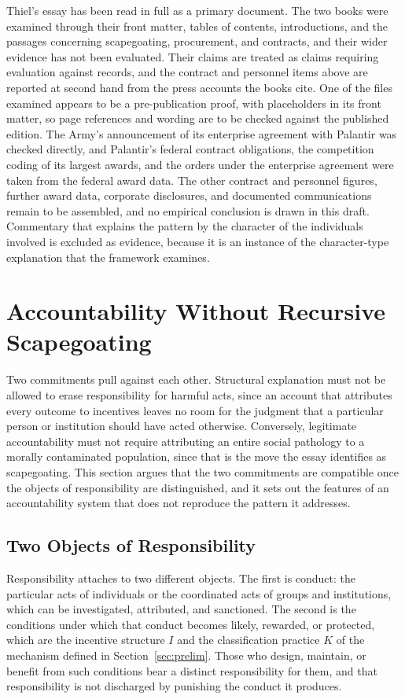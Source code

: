 \documentclass[12pt]{article}
\theoremstyle{remark}
\begin{document}
Thiel's essay has been read in full as a primary document. The two books were examined through their front matter, tables of contents, introductions, and the passages concerning scapegoating, procurement, and contracts, and their wider evidence has not been evaluated. Their claims are treated as claims requiring evaluation against records, and the contract and personnel items above are reported at second hand from the press accounts the books cite. One of the files examined appears to be a pre-publication proof, with placeholders in its front matter, so page references and wording are to be checked against the published edition. The Army's announcement of its enterprise agreement with Palantir was checked directly, and Palantir's federal contract obligations, the competition coding of its largest awards, and the orders under the enterprise agreement were taken from the federal award data. The other contract and personnel figures, further award data, corporate disclosures, and documented communications remain to be assembled, and no empirical conclusion is drawn in this draft. Commentary that explains the pattern by the character of the individuals involved is excluded as evidence, because it is an instance of the character-type explanation that the framework examines.

\section{Accountability Without Recursive Scapegoating}
\label{sec:account}

Two commitments pull against each other. Structural explanation must not be allowed to erase responsibility for harmful acts, since an account that attributes every outcome to incentives leaves no room for the judgment that a particular person or institution should have acted otherwise. Conversely, legitimate accountability must not require attributing an entire social pathology to a morally contaminated population, since that is the move the essay identifies as scapegoating. This section argues that the two commitments are compatible once the objects of responsibility are distinguished, and it sets out the features of an accountability system that does not reproduce the pattern it addresses.

\subsection{Two Objects of Responsibility}

Responsibility attaches to two different objects. The first is conduct: the particular acts of individuals or the coordinated acts of groups and institutions, which can be investigated, attributed, and sanctioned. The second is the conditions under which that conduct becomes likely, rewarded, or protected, which are the incentive structure $I$ and the classification practice $K$ of the mechanism defined in Section~\ref{sec:prelim}. Those who design, maintain, or benefit from such conditions bear a distinct responsibility for them, and that responsibility is not discharged by punishing the conduct it produces.
\end{document}
